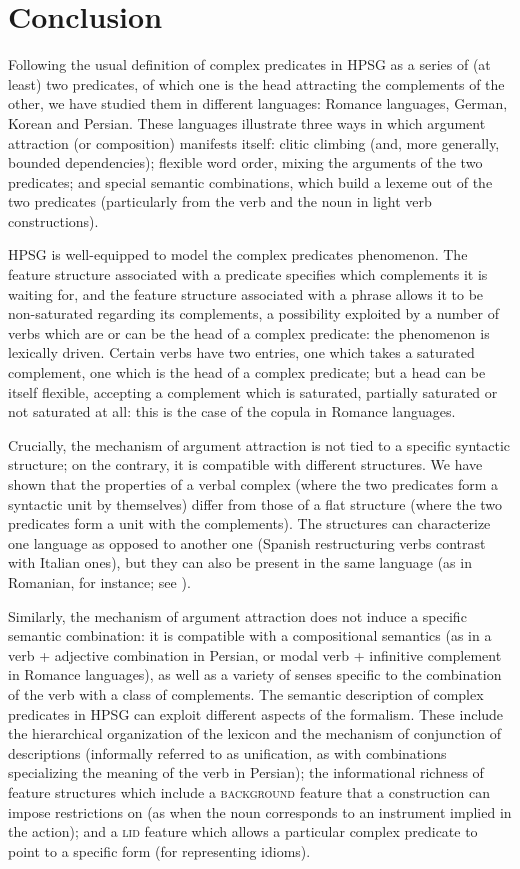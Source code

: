 {\section{Conclusion}\label{GSsection6}

Following the usual definition of complex predicates in HPSG as a series of (at least) two predicates, of which one is the head attracting the complements of the other, we have studied them in different languages: Romance languages, German, Korean and Persian. These languages illustrate three ways in which argument attraction (or composition) manifests itself: clitic climbing (and, more generally, bounded dependencies); flexible word order, mixing the arguments of the two predicates; and special semantic combinations, which build a lexeme out of the two predicates (particularly from the verb and the noun in light verb constructions). 

HPSG is well-equipped to model the complex predicates phenomenon. The feature structure associated with a predicate specifies which complements it is waiting for, and the feature structure associated with a phrase allows it to be non-saturated regarding its complements, a possibility exploited by a number of verbs which are or can be the head of a complex predicate: the phenomenon is lexically driven. Certain verbs have two entries, one which takes a saturated complement, one which is the head of a complex predicate; but a head can be itself flexible, accepting a complement which is saturated, partially saturated or not saturated at all: this is the case of the copula in Romance languages.

Crucially, the mechanism of argument attraction is not tied to a specific syntactic structure; on
the contrary, it is compatible with different structures. We have shown that the properties of a
verbal complex (where the two predicates form a syntactic unit by themselves) differ from those of a
flat structure (where the two predicates form a unit with the complements). The structures can
characterize one language as opposed to another one (Spanish restructuring verbs contrast with Italian
ones), but they can also be present in the same language (as in Romanian, for instance; see \citealt{Monachesi99b-u}). 

Similarly, the mechanism of argument attraction does not induce a specific semantic combination: it
is compatible with a compositional semantics (as in a verb + adjective combination in Persian, or
modal verb + infinitive complement in Romance languages), as well as a variety of senses specific to
the combination of the verb with a class of complements. 
The semantic description of complex predicates in HPSG can exploit different aspects of the formalism.
These include the hierarchical organization of the lexicon and the mechanism of conjunction of descriptions (informally referred to as unification, as with combinations specializing the meaning of the verb in Persian); the informational richness of feature structures which include a \textsc{background} feature that a construction can impose restrictions on (as when the noun corresponds to an instrument implied in the action); and a \textsc{lid} feature which allows a particular complex predicate to point to a specific form (for representing idioms).    

}
